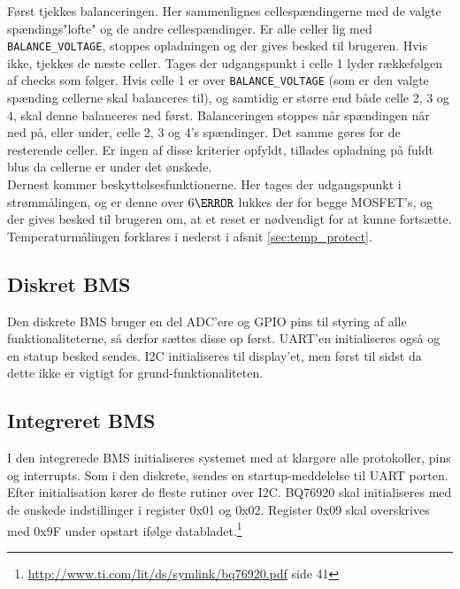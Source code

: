 Først tjekkes balanceringen. Her sammenlignes cellespændingerne med de valgte spændings"lofte" \space og de andre cellespændinger. Er alle celler lig med \verb|BALANCE_VOLTAGE|, stoppes opladningen og der gives besked til brugeren. Hvis ikke, tjekkes de næste celler. Tages der udgangspunkt i celle 1 lyder rækkefølgen af checks som følger. Hvis celle 1 er over \verb|BALANCE_VOLTAGE| (som er den valgte spænding cellerne skal balanceres til), og samtidig er større end både celle 2, 3 og 4, skal denne balanceres ned først. Balanceringen stoppes når spændingen når ned på, eller under, celle 2, 3 og 4's spændinger. Det samme gøres for de resterende celler. Er ingen af disse kriterier opfyldt, tillades opladning på fuldt blus da cellerne er under det ønskede.\\

Dernest kommer beskyttelsesfunktionerne. Her tages der udgangspunkt i strømmålingen, og er denne over $6\ampere$ lukkes der for begge MOSFET's, og der gives besked til brugeren om, at et reset er nødvendigt for at kunne fortsætte. \\

Temperaturmålingen forklares i nederst i afsnit \ref{sec:temp_protect}.

\subsection{Diskret BMS}
Den diskrete BMS bruger en del ADC'ere og GPIO pins til styring af alle funktionaliteterne, så derfor sættes disse op først. UART'en initialiseres også og en statup besked sendes. I2C initialiseres til display'et, men først til sidst da dette ikke er vigtigt for grund-funktionaliteten. \\

\subsection{Integreret BMS}
I den integrerede BMS initialiseres systemet med at klargøre alle protokoller, pins og interrupts. Som i den diskrete, sendes en startup-meddelelse til UART porten. Efter initialisation kører de fleste rutiner over I2C. BQ76920 skal initialiseres med de ønskede indstillinger i register 0x01 og 0x02. Register 0x09 skal overskrives med 0x9F under opstart ifølge databladet.\footnote{\url{http://www.ti.com/lit/ds/symlink/bq76920.pdf} side 41} \\